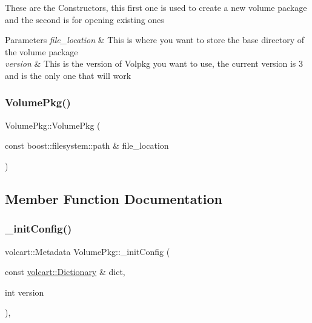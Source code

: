 These are the Constructors, this first one is used to create a new volume package and the second is for opening existing ones 
\begin{DoxyParams}{Parameters}
{\em file\+\_\+location} & This is where you want to store the base directory of the volume package \\
\hline
{\em version} & This is the version of Volpkg you want to use, the current version is 3 and is the only one that will work \\
\hline
\end{DoxyParams}
\hypertarget{classVolumePkg_a901f84ed2afd19ca64d4052e55340bb5}{}\label{classVolumePkg_a901f84ed2afd19ca64d4052e55340bb5} 
\subsubsection{\texorpdfstring{Volume\+Pkg()}{VolumePkg()}\hspace{0.1cm}{\footnotesize\ttfamily [2/2]}}
{\footnotesize\ttfamily Volume\+Pkg\+::\+Volume\+Pkg (\begin{DoxyParamCaption}\item[{const boost\+::filesystem\+::path \&}]{file\+\_\+location }\end{DoxyParamCaption})}



\subsection{Member Function Documentation}
\hypertarget{classVolumePkg_ab5a10d5694859b8338e100439e2bf118}{}\label{classVolumePkg_ab5a10d5694859b8338e100439e2bf118} 
\subsubsection{\texorpdfstring{\+\_\+init\+Config()}{\_initConfig()}}
{\footnotesize\ttfamily volcart\+::\+Metadata Volume\+Pkg\+::\+\_\+init\+Config (\begin{DoxyParamCaption}\item[{const \hyperlink{namespacevolcart_aa4e334ff80b678b9556aee59618eb37a}{volcart\+::\+Dictionary} \&}]{dict,  }\item[{int}]{version }\end{DoxyParamCaption})\hspace{0.3cm}{\ttfamily [static]}, {\ttfamily [private]}}

